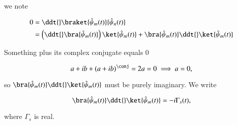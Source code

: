 we note

\begin{align*}
0 
&=
\ddt{} \braket{\hat{\psi}_m(t)}{\hat{\psi}_n(t)} \\
&=
\left( \ddt{} \bra{\hat{\psi}_m(t)} \right) \ket{\hat{\psi}_m(t)} 
+ \bra{\hat{\psi}_m(t)} \ddt{} \ket{\hat{\psi}_m(t)} \\
\end{align*}

Something plus its complex conjugate equals 0

\begin{equation}\label{eqn:qmTwoL8:470}
a + i b + (a + i b)^\conj = 2 a = 0 \implies a = 0,
\end{equation}

so $\bra{\hat{\psi}_m(t)} \ddt{} \ket{\hat{\psi}_m(t)}$ must be purely imaginary.  We write

\begin{equation}\label{eqn:qmTwoL8:490}
\bra{\hat{\psi}_m(t)} \ddt{} \ket{\hat{\psi}_m(t)} = -i \Gamma_s(t),
\end{equation}

where $\Gamma_s$ is real.


\EndArticle
